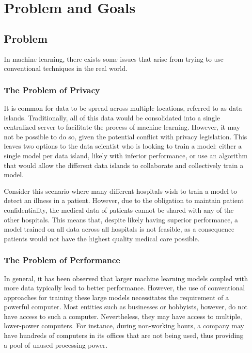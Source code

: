 \chapter{Problem and Goals}
\section{Problem}
In machine learning, there exists some issues that arise from trying to use conventional techniques in the real world.

\subsection{The Problem of Privacy}
It is common for data to be spread across multiple locations, referred to as data islands. Traditionally, all of this data would be consolidated into a single centralized server to facilitate the process of machine learning. However, it may not be possible to do so, given the potential conflict with privacy legislation. This leaves two options to the data scientist who is looking to train a model: either a single model per data island, likely with inferior performance, or use an algorithm that would allow the different data islands to collaborate and collectively train a model.

Consider this scenario where many different hospitals wish to train a model to detect an illness in a patient. However, due to the obligation to maintain patient confidentiality, the medical data of patients cannot be shared with any of the other hospitals. This means that, despite likely having superior performance, a model trained on all data across all hospitals is not feasible, as a consequence patients would not have the highest quality medical care possible.

\subsection{The Problem of Performance}
In general, it has been observed that larger machine learning models coupled with more data typically lead to better performance. However, the use of conventional approaches for training these large models necessitates the requirement of a powerful computer. Most entities such as businesses or hobbyists, however, do not have access to such a computer. Nevertheless, they may have access to multiple, lower-power computers. For instance, during non-working hours, a company may have hundreds of computers in its offices that are not being used, thus providing a pool of unused processing power.

